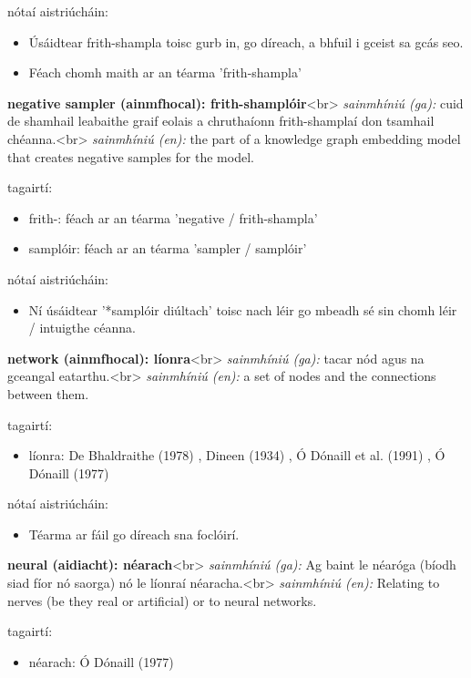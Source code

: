 \documentclass{article}
\begin{document}
nótaí aistriúcháin:
\begin{itemize}
	\item Úsáidtear frith-shampla toisc gurb in, go díreach, a bhfuil i gceist sa gcás seo.
	\item Féach chomh maith ar an téarma 'frith-shampla'
\end{itemize}


\textbf{negative sampler (ainmfhocal): frith-shamplóir}<br>
\textit{sainmhíniú (ga):} cuid de shamhail leabaithe graif eolais a chruthaíonn frith-shamplaí don tsamhail chéanna.<br>
\textit{sainmhíniú (en):} the part of a knowledge graph embedding model that creates negative samples for the model.

tagairtí:
\begin{itemize}
	\item frith-: féach ar an téarma 'negative / frith-shampla'
	\item samplóir: féach ar an téarma 'sampler / samplóir'
\end{itemize}

nótaí aistriúcháin:
\begin{itemize}
	\item Ní úsáidtear '*samplóir diúltach' toisc nach léir go mbeadh sé sin chomh léir / intuigthe céanna.
\end{itemize}


\textbf{network (ainmfhocal): líonra}<br>
\textit{sainmhíniú (ga):} tacar nód agus na gceangal eatarthu.<br>
\textit{sainmhíniú (en):} a set of nodes and the connections between them.

tagairtí:
\begin{itemize}
	\item líonra: De Bhaldraithe (1978) \cite{de-bhaldraithe}, Dineen (1934) \cite{dineen}, Ó Dónaill et al. (1991) \cite{focloir-beag}, Ó Dónaill (1977) \cite{odonaill}
\end{itemize}

nótaí aistriúcháin:
\begin{itemize}
	\item Téarma ar fáil go díreach sna foclóirí.
\end{itemize}


\textbf{neural (aidiacht): néarach}<br>
\textit{sainmhíniú (ga):} Ag baint le néaróga (bíodh siad fíor nó saorga) nó le líonraí néaracha.<br>
\textit{sainmhíniú (en):} Relating to nerves (be they real or artificial) or to neural networks.

tagairtí:
\begin{itemize}
	\item néarach: Ó Dónaill (1977) \cite{odonaill}
\end{itemize}
\end{document}
